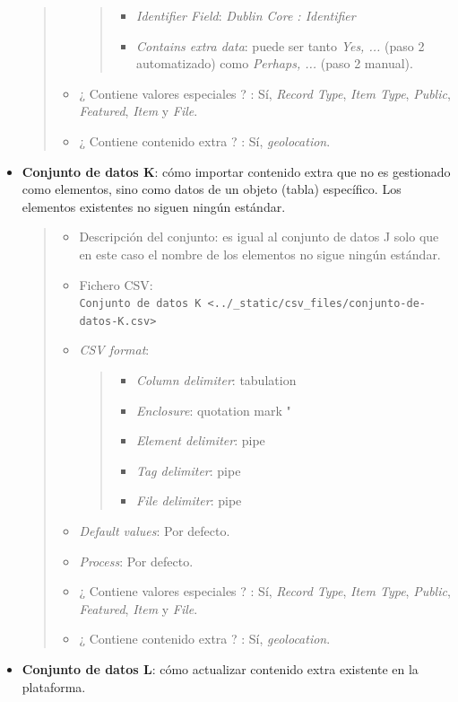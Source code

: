 \documentclass[
]{article}
\providecommand{\tightlist}{%
  \setlength{\itemsep}{0pt}\setlength{\parskip}{0pt}}
\begin{document}
\begin{itemize}
\begin{quote}
\begin{itemize}
    \begin{quote}
    \begin{itemize}
    \tightlist
    \item
      \emph{Identifier Field}: \emph{Dublin Core : Identifier}
    \item
      \emph{Contains extra data}: puede ser tanto \emph{Yes, ...} (paso
      2 automatizado) como \emph{Perhaps, ...} (paso 2 manual).
    \end{itemize}
    \end{quote}
  \item
    ¿ Contiene valores especiales ? : Sí, \emph{Record Type}, \emph{Item
    Type}, \emph{Public}, \emph{Featured}, \emph{Item} y \emph{File}.
  \item
    ¿ Contiene contenido extra ? : Sí, \emph{geolocation}.
  \end{itemize}
  \end{quote}
\item
  \textbf{Conjunto de datos K}: cómo importar contenido extra que no es
  gestionado como elementos, sino como datos de un objeto (tabla)
  específico. Los elementos existentes no siguen ningún estándar.

  \begin{quote}
  \begin{itemize}
  \item
    Descripción del conjunto: es igual al conjunto de datos J solo que
    en este caso el nombre de los elementos no sigue ningún estándar.
  \item
    Fichero CSV:
    \texttt{Conjunto\ de\ datos\ K\ \textless{}../\_static/csv\_files/conjunto-de-datos-K.csv\textgreater{}}
  \item
    \emph{CSV format}:

    \begin{quote}
    \begin{itemize}
    \tightlist
    \item
      \emph{Column delimiter}: tabulation
    \item
      \emph{Enclosure}: quotation mark "
    \item
      \emph{Element delimiter}: pipe
    \item
      \emph{Tag delimiter}: pipe
    \item
      \emph{File delimiter}: pipe
    \end{itemize}
    \end{quote}
  \item
    \emph{Default values}: Por defecto.
  \item
    \emph{Process}: Por defecto.
  \item
    ¿ Contiene valores especiales ? : Sí, \emph{Record Type}, \emph{Item
    Type}, \emph{Public}, \emph{Featured}, \emph{Item} y \emph{File}.
  \item
    ¿ Contiene contenido extra ? : Sí, \emph{geolocation}.
  \end{itemize}
  \end{quote}
\item
  \textbf{Conjunto de datos L}: cómo actualizar contenido extra
  existente en la plataforma.


\end{itemize}
\end{document}
